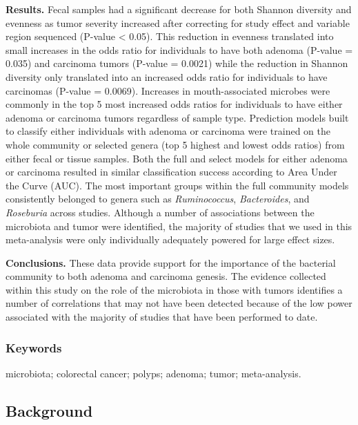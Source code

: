 \documentclass[12pt,]{article}
\begin{document}
\textbf{Results.} Fecal samples had a significant decrease for both
Shannon diversity and evenness as tumor severity increased after
correcting for study effect and variable region sequenced (P-value
\textless{} 0.05). This reduction in evenness translated into small
increases in the odds ratio for individuals to have both adenoma
(P-value = 0.035) and carcinoma tumors (P-value = 0.0021) while the
reduction in Shannon diversity only translated into an increased odds
ratio for individuals to have carcinomas (P-value = 0.0069). Increases
in mouth-associated microbes were commonly in the top 5 most increased
odds ratios for individuals to have either adenoma or carcinoma tumors
regardless of sample type. Prediction models built to classify either
individuals with adenoma or carcinoma were trained on the whole
community or selected genera (top 5 highest and lowest odds ratios) from
either fecal or tissue samples. Both the full and select models for
either adenoma or carcinoma resulted in similar classification success
according to Area Under the Curve (AUC). The most important groups
within the full community models consistently belonged to genera such as
\emph{Ruminococcus}, \emph{Bacteroides}, and \emph{Roseburia} across
studies. Although a number of associations between the microbiota and
tumor were identified, the majority of studies that we used in this
meta-analysis were only individually adequately powered for large effect
sizes.

\textbf{Conclusions.} These data provide support for the importance of
the bacterial community to both adenoma and carcinoma genesis. The
evidence collected within this study on the role of the microbiota in
those with tumors identifies a number of correlations that may not have
been detected because of the low power associated with the majority of
studies that have been performed to date.

\subsubsection{Keywords}\label{keywords}

microbiota; colorectal cancer; polyps; adenoma; tumor; meta-analysis.

\newpage

\subsection{Background}\label{background}
\end{document}
